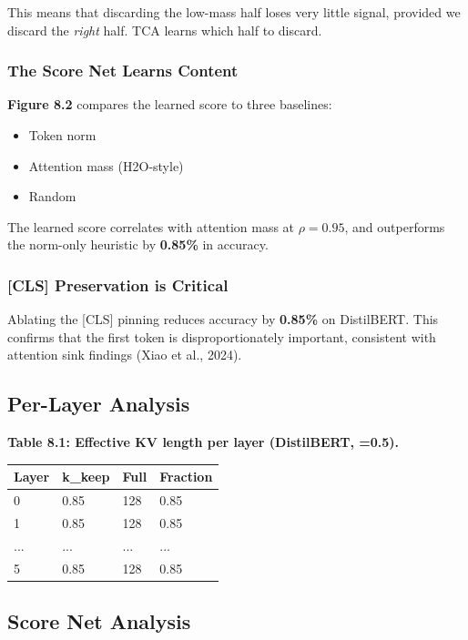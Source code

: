 This means that discarding the low-mass half loses very little signal, 
provided we discard the \textit{right} half. TCA learns which half to discard.

\subsubsection{The Score Net Learns Content}

\textbf{Figure 8.2} compares the learned score to three baselines:
\begin{itemize}
\item Token norm
\item Attention mass (H2O-style)
\item Random

\end{itemize}
The learned score correlates with attention mass at $\rho = 0.95$, and 
outperforms the norm-only heuristic by \textbf{0.85\%} in accuracy.

\subsubsection{[CLS] Preservation is Critical}

Ablating the [CLS] pinning reduces accuracy by \textbf{0.85\%} on 
DistilBERT. This confirms that the first token is disproportionately 
important, consistent with attention sink findings (Xiao et al., 2024).

\subsection{Per-Layer Analysis}

\textbf{Table 8.1: Effective KV length per layer (DistilBERT,  =0.5).}

\begin{table}[H]
\centering
\small
\begin{tabular}{llll}
\toprule
\textbf{Layer} & \textbf{k\_keep} & \textbf{Full} & \textbf{Fraction} \\
\midrule
0 & 0.85 & 128 & 0.85 \\
1 & 0.85 & 128 & 0.85 \\
... & ... & ... & ... \\
5 & 0.85 & 128 & 0.85 \\
\bottomrule
\end{tabular}
\end{table}

\subsection{Score Net Analysis}

